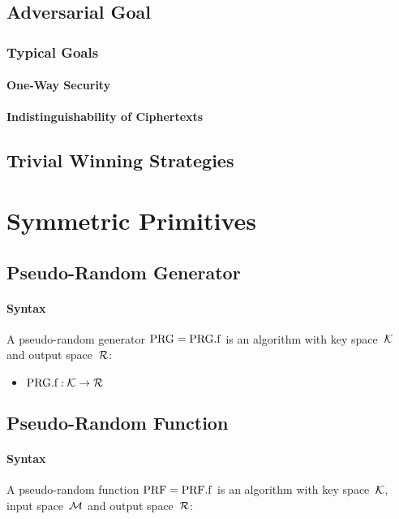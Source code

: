 \documentclass[a4paper,orivec]{llncs}
\begin{document}
\subsection{Adversarial Goal}

\subsubsection{Typical Goals}

\paragraph{One-Way Security}

\paragraph{Indistinguishability of Ciphertexts}

\subsection{Trivial Winning Strategies}


\section{Symmetric Primitives}


\subsection{Pseudo-Random Generator}


\paragraph{Syntax}
A pseudo-random generator $\mathrm{PRG}=\mathrm{PRG}.\mathrm{f}$ is an algorithm with key space~$\mathcal{K}$ and output space~$\mathcal{R}$:

\begin{itemize}
    \item $\mathrm{PRG}.\mathrm{f}: \mathcal{K} \to \mathcal{R}$
\end{itemize}

\subsection{Pseudo-Random Function}

\paragraph{Syntax}
A pseudo-random function $\mathrm{PRF}=\mathrm{PRF}.\mathrm{f}$ is an algorithm with key space~$\mathcal{K}$, input space~$\mathcal{M}$ and output space~$\mathcal{R}$:
\end{document}
